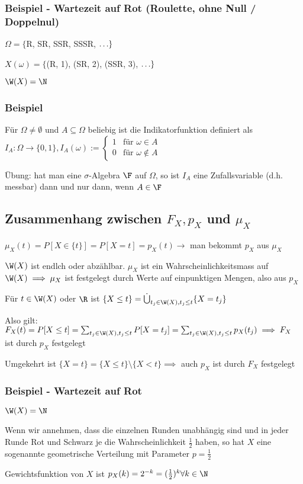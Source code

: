 \subsubsection{Beispiel - Wartezeit auf Rot (Roulette, ohne Null / Doppelnul)}
\enumstart
	\item $\Omega = \{$R, SR, SSR, SSSR, $\mathellipsis\}$
	\item $X(\omega) = \{$(R, 1), (SR, 2), (SSR, 3), $\mathellipsis\}$
	\item $\W(X) = \N$
\enumend

\subsubsection{Beispiel}
\enumstart
	\item Für $\Omega \ne \emptyset$ und $A\subseteq \Omega$ beliebig ist die Indikatorfunktion definiert als $I_A: \Omega \rightarrow \{0,1\}, I_A(\omega) := \begin{cases}1 &\text{für } \omega \in A \\0 &\text{für } \omega \notin A\end{cases}$
	\item Übung: hat man eine $\sigma$-Algebra $\F$ auf $\Omega$, so ist $I_A$ eine Zufallsvariable (d.h. messbar) dann und nur dann, wenn $A \in \F$
\enumend

\subsection{Zusammenhang zwischen $F_X, p_X$ und $\mu_X$}
\enumstart
	\item $\mu_X(t) = P[X \in \{t\}] = P[X = t] = p_X(t) \rightarrow$ man bekommt $p_X$ aus $\mu_X$
	\item $\W(X)$ ist endlch oder abzählbar. $\mu_X$ ist ein Wahrscheinlichkeitsmass auf $\W(X) \implies \mu_X$ ist festgelegt durch Werte auf einpunktigen Mengen, also aus $p_X$
	\item Für $t \in \W(X)$ oder $\R$ ist $\{X \le t\} = \dot\bigcup_{t_j \in \W(X), t_j \le t}\{X = t_j\}$
	\item Also gilt: $F_X(t) = P[X \le t] = \sum_{t_j \in \W(X), t_j \le t}P[X = t_j] = \sum_{t_j \in \W(X), t_j \le t}p_X(t_j) \implies F_X$ ist durch $p_X$ festgelegt
	\item Umgekehrt ist $\{X = t\} = \{X \le t\} \setminus \{X < t\} \implies$ auch $p_X$ ist durch $F_X$ festgelegt
\enumend

\subsubsection{Beispiel - Wartezeit auf Rot}
\enumstart
	\item $\W(X) = \N$
	\item Wenn wir annehmen, dass die einzelnen Runden unabhängig sind und in jeder Runde Rot und Schwarz je die Wahrscheinlichkeit $\frac{1}{2}$ haben, so hat $X$ eine sogenannte geometrische Verteilung mit Parameter $p = \frac{1}{2}$
	\item Gewichtsfunktion von $X$ ist $p_X(k) = 2^{-k} = (\frac{1}{2})^k \forall k \in \N$
\enumend

